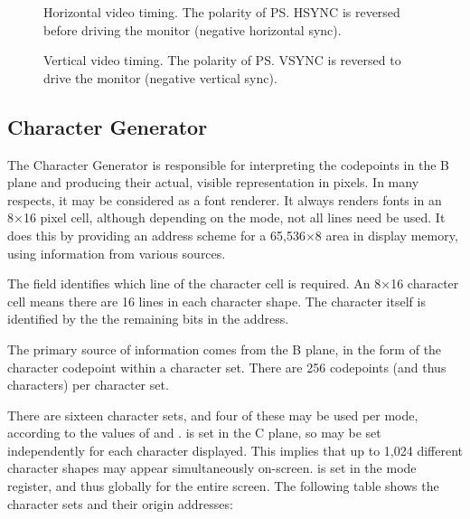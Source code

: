\begin{figure}
\centering
{}
\caption[Horizontal Timing]{\label{fig:vdu-horz-timing} Horizontal video timing. The polarity of \ps{HSYNC} is reversed before driving the monitor (negative horizontal sync).}
\end{figure}

\begin{figure}
\centering
{}
\caption[Vertical Timing]{\label{fig:vdu-vert-timing} Vertical video timing. The polarity of \ps{VSYNC} is reversed to drive the monitor (negative vertical sync).}
\end{figure}





\subsection{Character Generator}
\label{sec:vdu:chargen}

The Character Generator is responsible for interpreting the codepoints in the B
plane and producing their actual, visible representation in pixels. In many
respects, it may be considered as a font renderer. It always renders fonts in
an 8×16 pixel cell, although depending on the mode, not all lines need be
used. It does this by providing an address scheme for a 65,536×8 area in
display memory, using information from various sources.

\begin{bitfield}
\end{bitfield}

The  field identifies which line of the character cell is
required. An 8×16 character cell means there are 16 lines in each character
shape. The character itself is identified by the the remaining bits in the
address.

The primary source of information comes from the B plane, in the form of the
character codepoint within a character set. There are 256 codepoints (and thus
characters) per character set.

There are sixteen character sets, and four of these may be used per mode,
according to the values of  and .  is set in
the C plane, so may be set independently for each character displayed. This
implies that up to 1,024 different character shapes may appear simultaneously
on-screen.  is set in the mode register, and thus globally for the
entire screen. The following table shows the character sets and their origin
addresses:

